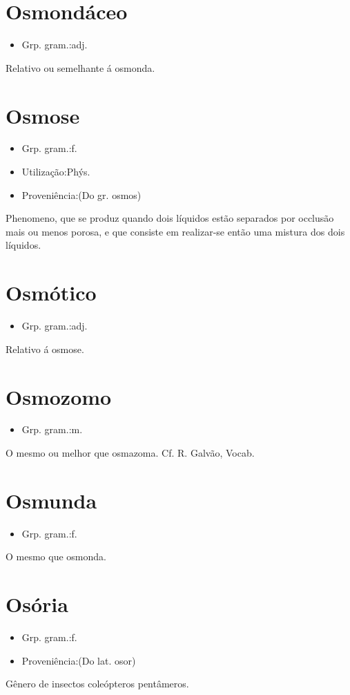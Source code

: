 \section{Osmondáceo}
\begin{itemize}
\item {Grp. gram.:adj.}
\end{itemize}
Relativo ou semelhante á osmonda.
\section{Osmose}
\begin{itemize}
\item {Grp. gram.:f.}
\end{itemize}
\begin{itemize}
\item {Utilização:Phýs.}
\end{itemize}
\begin{itemize}
\item {Proveniência:(Do gr. \textunderscore osmos\textunderscore )}
\end{itemize}
Phenomeno, que se produz quando dois líquidos estão separados por occlusão mais ou menos porosa, e que consiste em realizar-se então uma mistura dos dois líquidos.
\section{Osmótico}
\begin{itemize}
\item {Grp. gram.:adj.}
\end{itemize}
Relativo á osmose.
\section{Osmozomo}
\begin{itemize}
\item {Grp. gram.:m.}
\end{itemize}
O mesmo ou melhor que \textunderscore osmazoma\textunderscore . Cf. R. Galvão, \textunderscore Vocab.\textunderscore 
\section{Osmunda}
\begin{itemize}
\item {Grp. gram.:f.}
\end{itemize}
O mesmo que \textunderscore osmonda\textunderscore .
\section{Osória}
\begin{itemize}
\item {Grp. gram.:f.}
\end{itemize}
\begin{itemize}
\item {Proveniência:(Do lat. \textunderscore osor\textunderscore )}
\end{itemize}
Gênero de insectos coleópteros pentâmeros.
